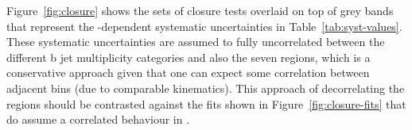 Figure~\ref{fig:closure} shows the sets of closure tests overlaid on
top of grey bands that represent the \scalht-dependent systematic
uncertainties in Table~\ref{tab:syst-values}. These systematic
uncertainties are assumed to fully uncorrelated between the different
b jet multiplicity categories and also the seven \scalht regions,
which is a conservative approach given that one can expect some
correlation between adjacent \scalht bins (due to comparable
kinematics).  This approach of decorrelating the \scalht regions
should be contrasted against the fits shown in
Figure~\ref{fig:closure-fits} that do assume a correlated behaviour in
\scalht.

%
%
